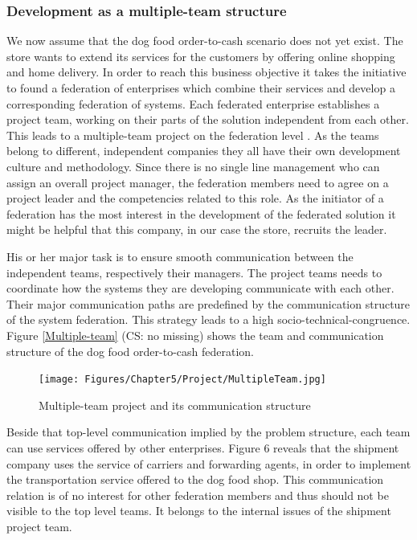\subsubsection{Development as a multiple-team structure}
We now assume that the dog food order-to-cash scenario does not yet exist. The store wants to extend its services for the customers by offering online shopping and home delivery. In order to reach this business objective it takes the initiative to found a federation of enterprises which combine their services and develop a corresponding federation of systems.
Each federated enterprise establishes a project team, working on their parts of the solution independent from each other. This leads to a multiple-team project on the federation level \cite{book:OrgPatternsAgile}. As the teams belong to different, independent companies they all have their own development culture and methodology.
Since there is no single line management who can assign an overall project manager, the federation members need to agree on a project leader and the competencies related to this role. As the initiator of a federation has the most interest in the development of the federated solution it might be helpful that this company, in our case the store, recruits the leader.

His or her major task is to ensure smooth communication between the independent teams, respectively their managers. The project teams needs to coordinate how the systems they are developing communicate with each other. Their major communication paths are predefined by the communication structure of the system federation. This strategy leads to a high socio-technical-congruence. Figure \ref{Multiple-team} (CS: no missing) shows the team and communication structure of the dog food order-to-cash federation.

\begin{figure}[htbp]
	\centering
	\texttt{[image: Figures/Chapter5/Project/MultipleTeam.jpg]}
	\caption[Multiple-team project and its communication structure]{Multiple-team project and its communication structure}
	\label{fig:Multiple-team}
\end{figure}

Beside that top-level communication implied by the problem structure, each team can use services offered by other enterprises. Figure 6 reveals that the shipment company uses the service of carriers and forwarding agents, in order to implement the transportation service offered to the dog food shop. This communication relation is of no interest for other federation members and thus should not be visible to the top level teams. It belongs to the internal issues of the shipment project team.
\\
